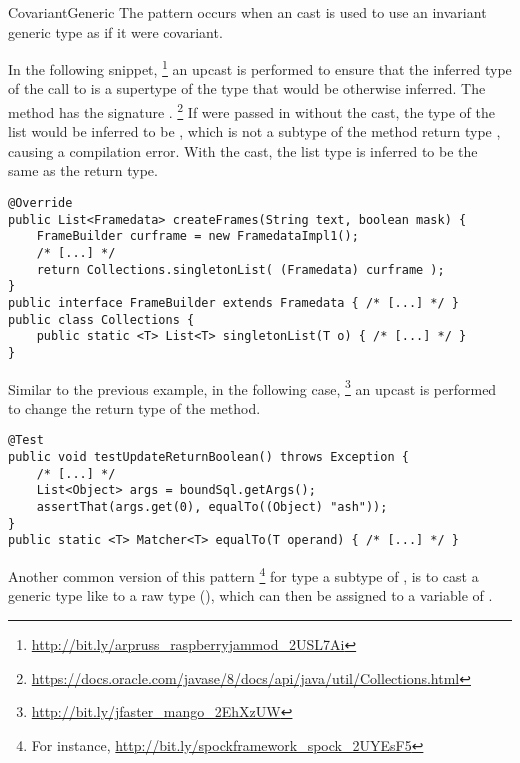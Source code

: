 \begin{pattern}{CovariantGeneric}
The \thisp{} pattern occurs when an cast is used to use an invariant generic type as if it were covariant.

\instances{}
In the following snippet,%
\footnote{\url{http://bit.ly/arpruss_raspberryjammod_2USL7Ai}}
an upcast is performed to ensure that the inferred type of the call to  is a supertype of the type that would be otherwise inferred.
The  method has the signature .%
\footnote{\url{https://docs.oracle.com/javase/8/docs/api/java/util/Collections.html}}
If  were passed in without the cast,
the type of the list would be inferred to be ,
which is not a subtype of the method return type ,
causing a compilation error.
With the cast, the list type is inferred to be the same as the return type.

\begin{verbatim}
@Override
public List<Framedata> createFrames(String text, boolean mask) {
    FrameBuilder curframe = new FramedataImpl1();
    /* [...] */
    return Collections.singletonList( (Framedata) curframe );
}
public interface FrameBuilder extends Framedata { /* [...] */ }
public class Collections {
    public static <T> List<T> singletonList(T o) { /* [...] */ }
}
\end{verbatim}

Similar to the previous example,
in the following case,%
\footnote{\url{http://bit.ly/jfaster_mango_2EhXzUW}}
an upcast is performed to change the return type of the  method.

\begin{verbatim}
@Test
public void testUpdateReturnBoolean() throws Exception {
    /* [...] */
    List<Object> args = boundSql.getArgs();
    assertThat(args.get(0), equalTo((Object) "ash"));
}
public static <T> Matcher<T> equalTo(T operand) { /* [...] */ }
\end{verbatim}

Another common version of this pattern%
\footnote{For instance, \url{http://bit.ly/spockframework_spock_2UYEsF5}}
for type  a subtype of ,
is to cast a generic type like  to a raw type (),
which can then be assigned to a variable of .


\end{pattern}

